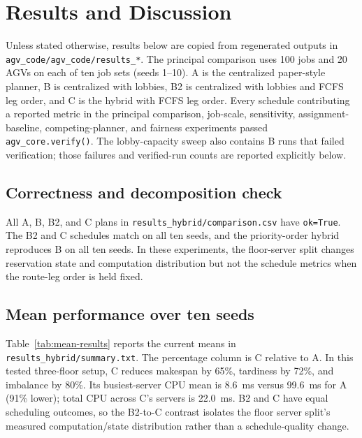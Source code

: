 \documentclass[11pt]{article}
\begin{document}
\section{Results and Discussion}
\label{sec:results-discussion}

Unless stated otherwise, results below are copied from regenerated outputs in
\texttt{agv\_code/agv\_code/results\_*}. The principal comparison uses 100
jobs and 20 AGVs on each of ten job sets (seeds 1--10). A is the centralized
paper-style planner, B is centralized with lobbies, B2 is centralized with
lobbies and FCFS leg order, and C is the hybrid with FCFS leg order. Every
schedule contributing a reported metric in the principal comparison,
job-scale, sensitivity, assignment-baseline, competing-planner, and fairness
experiments passed \texttt{agv\_core.verify()}. The lobby-capacity sweep also
contains B runs that failed verification; those failures and verified-run
counts are reported explicitly below.

\subsection{Correctness and decomposition check}

All A, B, B2, and C plans in \texttt{results\_hybrid/comparison.csv} have
\texttt{ok=True}. The B2 and C schedules match on all ten seeds, and the
priority-order hybrid reproduces B on all ten seeds. In these experiments,
the floor-server split changes reservation state and computation distribution
but not the schedule metrics when the route-leg order is held fixed.

\subsection{Mean performance over ten seeds}

Table~\ref{tab:mean-results} reports the current means in
\texttt{results\_hybrid/summary.txt}. The percentage column is C relative to
A. In this tested three-floor setup, C reduces makespan by 65\%, tardiness by
72\%, and imbalance by 80\%. Its busiest-server CPU mean is 8.6~ms versus
99.6~ms for A (91\% lower); total CPU across C's servers is 22.0~ms. B2 and C
have equal scheduling outcomes, so the B2-to-C contrast isolates the floor
server split's measured computation/state distribution rather than a
schedule-quality change.
\end{document}
